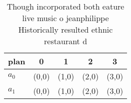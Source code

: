 \documentclass[a4paper]{article}
\begin{document}
\begin{table}
\begin{adjustbox}{width=0.5\columnwidth}
\begin{tabular}{|l|l|l|l|l|}
\hline
\textbf{plan} & \multicolumn{1}{c|}{\textbf{0}} & \multicolumn{1}{c|}{\textbf{1}} & \multicolumn{1}{c|}{\textbf{2}} & \multicolumn{1}{c|}{\textbf{3}} \\ \hline
\textbf{$a_0$}  & (0,0) & (1,0) & (2,0) & (3,0) \\ \hline
\textbf{$a_1$}  & (0,0) & (1,0) & (2,0) & (3,0) \\ \hline
\end{tabular}
\end{adjustbox}
\caption{Though incorporated both eature live music o jeanphilippe Historically resulted ethnic restaurant d
}
\end{table}
\end{document}
